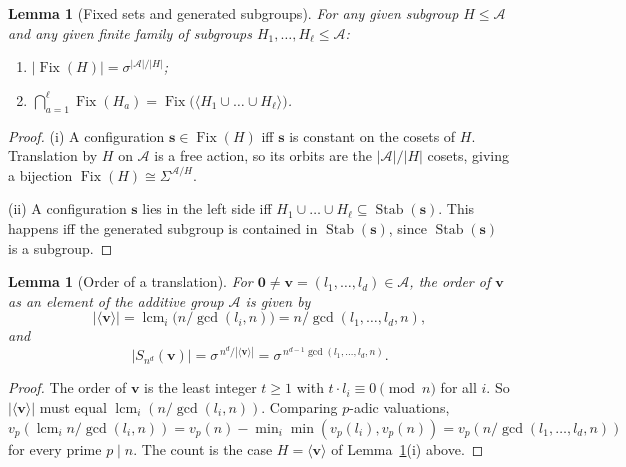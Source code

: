\documentclass[11pt,a4paper]{article}
\newtheorem{lemma}[theorem]{Lemma}
\theoremstyle{remark}
\DeclareMathOperator{\lcm}{lcm}
\DeclareMathOperator{\Fix}{Fix}
\DeclareMathOperator{\Stab}{Stab}
\newcommand{\A}{\mathcal{A}}
\newcommand{\vv}{\mathbf{v}}
\newcommand{\ssb}{\mathbf{s}}
\begin{document}
\begin{lemma}[Fixed sets and generated subgroups]\label{lem:fix}
For any given subgroup $H\le\A$ and any given finite family of subgroups $H_1,\dots,H_\ell\le\A$:
\begin{enumerate}[label=(\roman*)]
\item $|\Fix(H)|=\sigma^{|\A|/|H|}$;
\item $\bigcap_{a=1}^{\ell}\Fix(H_a)
      =\Fix\bigl(\langle H_1\cup\dots\cup H_\ell\rangle\bigr)$.
\end{enumerate}
\end{lemma}

\begin{proof}
(i) A configuration $\ssb\in\Fix(H)$ iff $\ssb$ is constant on the cosets of $H$. Translation by $H$ on $\A$ is a free action, so its orbits are the $|\A|/|H|$
cosets, giving a bijection $\Fix(H)\cong\Sigma^{\A/H}$.

(ii) A configuration $\ssb$ lies in the left side iff $H_1\cup\dots\cup
H_\ell\subseteq\Stab(\ssb)$. This happens iff the generated subgroup is contained in
$\Stab(\ssb)$, since $\Stab(\ssb)$ is a subgroup.
\end{proof}

\begin{lemma}[Order of a translation]\label{lem:order}
For $\mathbf 0\neq\vv=(l_1,\dots,l_d)\in\A$, the order of $\vv$ as an element of the additive group $\A$ is given by
\[|\langle\vv\rangle| = \lcm_i\bigl(n/\gcd(l_i,n)\bigr) =
n/\gcd(l_1,\dots,l_d,n),\] and
\[|S_{n^d}(\vv)|=\sigma^{\,n^d/|\langle\vv\rangle|}
=\sigma^{\,n^{d-1}\gcd(l_1,\dots,l_d,n)}.\]
\end{lemma}

\begin{proof}
The order of $\vv$ is the least integer $t\ge1$ with $t \cdot l_i\equiv0\pmod n$ for all
$i$. So $|\langle\vv\rangle|$ must equal $\lcm_i(n/\gcd(l_i,n))$. Comparing $p$-adic valuations,
$v_p(\lcm_i n/\gcd(l_i,n)) = v_p(n)-\min_i\min(v_p(l_i),v_p(n)) =
v_p(n/\gcd(l_1,\dots,l_d,n))$ for every prime $p\mid n$. The count is the
case $H=\langle\vv\rangle$ of Lemma~\ref{lem:fix}(i) above.
\end{proof}
\end{document}
